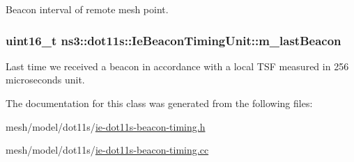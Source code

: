 Beacon interval of remote mesh point. 

\subsubsection[{\texorpdfstring{m\+\_\+last\+Beacon}{m_lastBeacon}}]{\setlength{\rightskip}{0pt plus 5cm}uint16\+\_\+t ns3\+::dot11s\+::\+Ie\+Beacon\+Timing\+Unit\+::m\+\_\+last\+Beacon\hspace{0.3cm}{\ttfamily [private]}}\hypertarget{classns3_1_1dot11s_1_1IeBeaconTimingUnit_a08fec700831f77cb940261e12440d977}{}\label{classns3_1_1dot11s_1_1IeBeaconTimingUnit_a08fec700831f77cb940261e12440d977}


Last time we received a beacon in accordance with a local T\+SF measured in 256 microseconds unit. 



The documentation for this class was generated from the following files\+:\begin{DoxyCompactItemize}
\item 
mesh/model/dot11s/\hyperlink{ie-dot11s-beacon-timing_8h}{ie-\/dot11s-\/beacon-\/timing.\+h}\item 
mesh/model/dot11s/\hyperlink{ie-dot11s-beacon-timing_8cc}{ie-\/dot11s-\/beacon-\/timing.\+cc}\end{DoxyCompactItemize}
